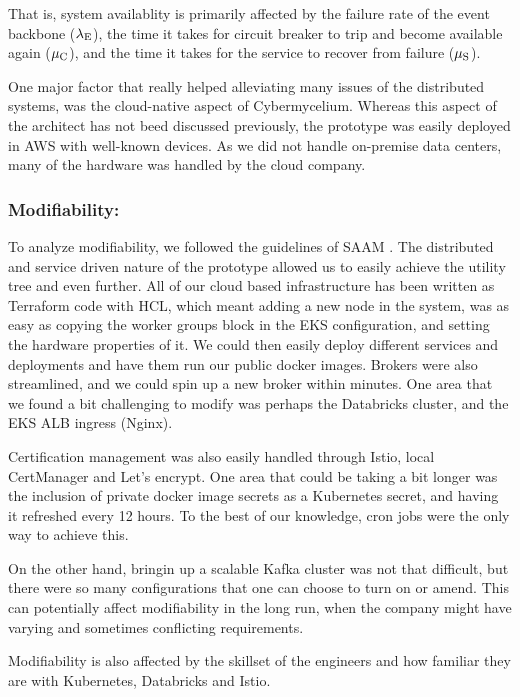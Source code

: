 \documentclass[review]{elsarticle}
\begin{document}
That is, system availablity is primarily affected by the failure rate of the event backbone ($\lambda \textsubscript{E}$), the time it takes for circuit breaker to trip and become available again ($\mu\textsubscript{C}$), and the time it takes for the service to recover from failure ($\mu\textsubscript{S}$).

One major factor that really helped alleviating many issues of the distributed systems, was the cloud-native aspect of Cybermycelium. Whereas this aspect of the architect has not beed discussed previously, the prototype was easily deployed in AWS with well-known devices. As we did not handle on-premise data centers, many of the hardware was handled by the cloud company. 

\subsubsection{Modifiability:}

To analyze modifiability, we followed the guidelines of SAAM \cite{kazman1994saam}. The distributed and service driven nature of the prototype allowed us to easily achieve the utility tree and even further. All of our cloud based infrastructure has been written as Terraform code with HCL, which meant adding a new node in the system, was as easy as copying the worker groups block in the EKS configuration, and setting the hardware properties of it. We could then easily deploy different services and deployments and have them run our public docker images. Brokers were also streamlined, and we could spin up a new broker within minutes. One area that we found a bit challenging to modify was perhaps the Databricks cluster, and the EKS ALB ingress (Nginx).

Certification management was also easily handled through Istio, local CertManager and Let's encrypt. One area that could be taking a bit longer was the inclusion of private docker image secrets as a Kubernetes secret, and having it refreshed every 12 hours. To the best of our knowledge, cron jobs were the only way to achieve this. 

On the other hand, bringin up a scalable Kafka cluster was not that difficult, but there were so many configurations that one can choose to turn on or amend. This can potentially affect modifiability in the long run, when the company might have varying and sometimes conflicting requirements. 

Modifiability is also affected by the skillset of the engineers and how familiar they are with Kubernetes, Databricks and Istio.
\end{document}
